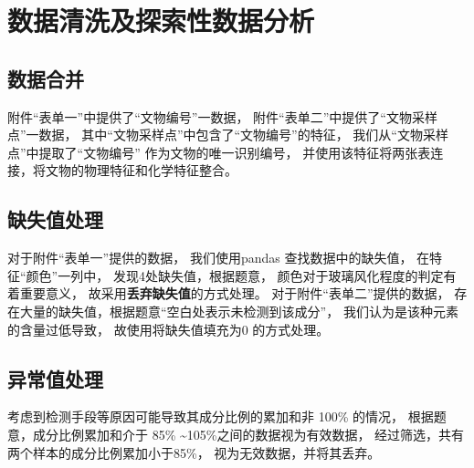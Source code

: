 \documentclass[withoutpreface,bwprint]{cumcmthesis} %
\begin{document}




\section{数据清洗及探索性数据分析}

\subsection{数据合并}

附件``表单一''中提供了``文物编号''一数据，
附件``表单二''中提供了``文物采样点''一数据，
其中``文物采样点''中包含了``文物编号''的特征，
我们从``文物采样点''中提取了``文物编号'' 作为文物的唯一识别编号，
并使用该特征将两张表连接，将文物的物理特征和化学特征整合。


\subsection{缺失值处理}
对于附件``表单一''提供的数据，
我们使用pandas \cite{reback2020pandas} 查找数据中的缺失值，
在特征``颜色''一列中，
发现4处缺失值，根据题意，
颜色对于玻璃风化程度的判定有着重要意义，
故采用\textbf{丢弃缺失值}的方式处理。
对于附件``表单二''提供的数据，
存在大量的缺失值，根据题意``空白处表示未检测到该成分''，
我们认为是该种元素的含量过低导致，
故使用将缺失值填充为$ 0 $ 的方式处理。


\subsection{异常值处理}
考虑到检测手段等原因可能导致其成分比例的累加和非 100\% 的情况，
根据题意，成分比例累加和介于 85\% \textasciitilde 105\%之间的数据视为有效数据，
经过筛选，共有两个样本的成分比例累加小于85\%，
视为无效数据，并将其丢弃。
\end{document}
